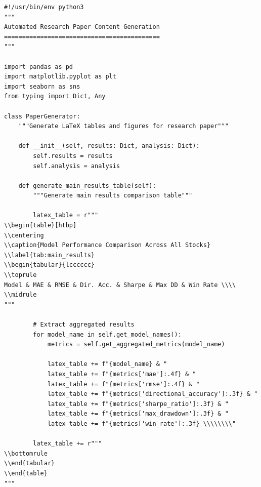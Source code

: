\documentclass[11pt]{article}
\begin{document}
\begin{lstlisting}[style=pythonstyle, caption=Automated Paper Generation]
#!/usr/bin/env python3
"""
Automated Research Paper Content Generation
===========================================
"""

import pandas as pd
import matplotlib.pyplot as plt
import seaborn as sns
from typing import Dict, Any

class PaperGenerator:
    """Generate LaTeX tables and figures for research paper"""
    
    def __init__(self, results: Dict, analysis: Dict):
        self.results = results
        self.analysis = analysis
        
    def generate_main_results_table(self):
        """Generate main results comparison table"""
        
        latex_table = r"""
\\begin{table}[htbp]
\\centering
\\caption{Model Performance Comparison Across All Stocks}
\\label{tab:main_results}
\\begin{tabular}{lcccccc}
\\toprule
Model & MAE & RMSE & Dir. Acc. & Sharpe & Max DD & Win Rate \\\\
\\midrule
"""
        
        # Extract aggregated results
        for model_name in self.get_model_names():
            metrics = self.get_aggregated_metrics(model_name)
            
            latex_table += f"{model_name} & "
            latex_table += f"{metrics['mae']:.4f} & "
            latex_table += f"{metrics['rmse']:.4f} & "
            latex_table += f"{metrics['directional_accuracy']:.3f} & "
            latex_table += f"{metrics['sharpe_ratio']:.3f} & "
            latex_table += f"{metrics['max_drawdown']:.3f} & "
            latex_table += f"{metrics['win_rate']:.3f} \\\\\\\\"
            
        latex_table += r"""
\\bottomrule
\\end{tabular}
\\end{table}
"""
        

\end{lstlisting}
\end{document}
